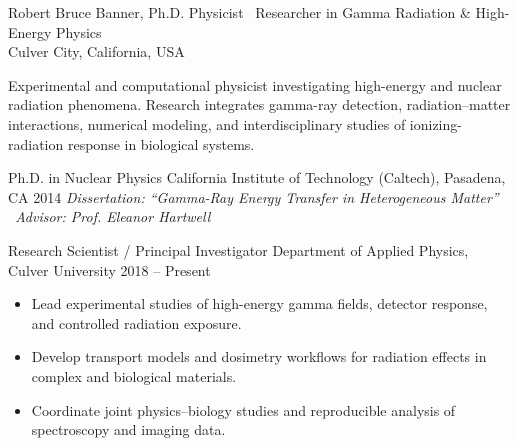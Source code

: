 
\resumeheader
    {Robert Bruce Banner, Ph.D.}
    {Physicist \textbar\ Researcher in Gamma Radiation \& High-Energy Physics}
    {
        \quad\textbar\quad
        \quad\textbar\quad
        \\[0.15em]
        Culver City, California, USA
        \quad\textbar\quad
        \quad\textbar\quad
    }

\resumesection{\academicprofiletitle}

Experimental and computational physicist investigating high-energy and nuclear radiation phenomena. Research integrates gamma-ray detection, radiation--matter interactions, numerical modeling, and interdisciplinary studies of ionizing-radiation response in biological systems.

\resumesection{\academiceducationtitle}

\resumeentry
    {Ph.D. in Nuclear Physics}
    {California Institute of Technology (Caltech), Pasadena, CA}
    {2014}
\textit{Dissertation: ``Gamma-Ray Energy Transfer in Heterogeneous Matter'' \textbar\ Advisor: Prof. Eleanor Hartwell}

\resumesection{\researchexperiencetitle}

\resumeentry
    {Research Scientist / Principal Investigator}
    {Department of Applied Physics, Culver University}
    {2018 -- Present}
\begin{itemize}
    \item Lead experimental studies of high-energy gamma fields, detector response, and controlled radiation exposure.
    \item Develop transport models and dosimetry workflows for radiation effects in complex and biological materials.
    \item Coordinate joint physics--biology studies and reproducible analysis of spectroscopy and imaging data.
\end{itemize}

